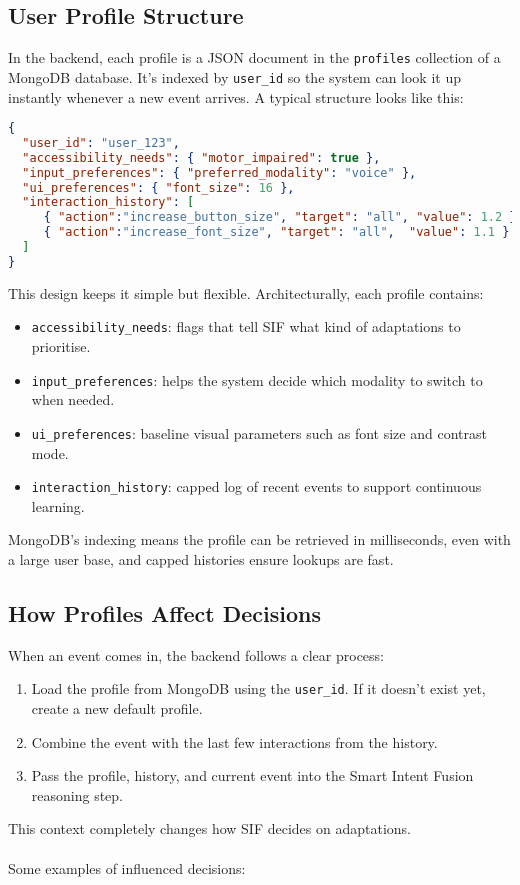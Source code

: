 \subsection{User Profile Structure}
In the backend, each profile is a JSON document in the \texttt{profiles} collection of a MongoDB database. It’s indexed by \texttt{user\_id} so the system can look it up instantly whenever a new event arrives. A typical structure looks like this:

\begin{lstlisting}[language=json, caption=Simplified User Profile Example]
{
  "user_id": "user_123",
  "accessibility_needs": { "motor_impaired": true },
  "input_preferences": { "preferred_modality": "voice" },
  "ui_preferences": { "font_size": 16 },
  "interaction_history": [
     { "action":"increase_button_size", "target": "all", "value": 1.2 },
     { "action":"increase_font_size", "target": "all",  "value": 1.1 } 
  ]
}
\end{lstlisting}

This design keeps it simple but flexible. Architecturally, each profile contains:
\begin{itemize}
    \item \texttt{accessibility\_needs}: flags that tell SIF what kind of adaptations to prioritise.
    \item \texttt{input\_preferences}: helps the system decide which modality to switch to when needed.
    \item \texttt{ui\_preferences}: baseline visual parameters such as font size and contrast mode.
    \item \texttt{interaction\_history}: capped log of recent events to support continuous learning.
\end{itemize}
MongoDB’s indexing means the profile can be retrieved in milliseconds, even with a large user base, and capped histories ensure lookups are fast.

\subsection{How Profiles Affect Decisions}
When an event comes in, the backend follows a clear process:
\begin{enumerate}
    \item Load the profile from MongoDB using the \texttt{user\_id}. If it doesn’t exist yet, create a new default profile.
    \item Combine the event with the last few interactions from the history.
    \item Pass the profile, history, and current event into the Smart Intent Fusion reasoning step.
\end{enumerate}
This context completely changes how SIF decides on adaptations.\\\\
Some examples of influenced decisions:

